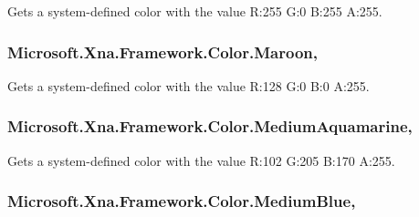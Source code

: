 Gets a system-\/defined color with the value R\+:255 G\+:0 B\+:255 A\+:255.

\hypertarget{struct_microsoft_1_1_xna_1_1_framework_1_1_color_a11631c2203817f8a406a3bdc33a3d659}{}
\subsubsection[{Maroon}]{ Microsoft.\+Xna.\+Framework.\+Color.\+Maroon\hspace{0.3cm}{\ttfamily [static]}, {\ttfamily [get]}}\label{struct_microsoft_1_1_xna_1_1_framework_1_1_color_a11631c2203817f8a406a3bdc33a3d659}


Gets a system-\/defined color with the value R\+:128 G\+:0 B\+:0 A\+:255.

\hypertarget{struct_microsoft_1_1_xna_1_1_framework_1_1_color_a1574c0abfeaca00c17d272915af2e362}{}
\subsubsection[{Medium\+Aquamarine}]{ Microsoft.\+Xna.\+Framework.\+Color.\+Medium\+Aquamarine\hspace{0.3cm}{\ttfamily [static]}, {\ttfamily [get]}}\label{struct_microsoft_1_1_xna_1_1_framework_1_1_color_a1574c0abfeaca00c17d272915af2e362}


Gets a system-\/defined color with the value R\+:102 G\+:205 B\+:170 A\+:255.

\hypertarget{struct_microsoft_1_1_xna_1_1_framework_1_1_color_a5774742dabf76dd7cf95ff1fae8f96d6}{}
\subsubsection[{Medium\+Blue}]{ Microsoft.\+Xna.\+Framework.\+Color.\+Medium\+Blue\hspace{0.3cm}{\ttfamily [static]}, {\ttfamily [get]}}\label{struct_microsoft_1_1_xna_1_1_framework_1_1_color_a5774742dabf76dd7cf95ff1fae8f96d6}


